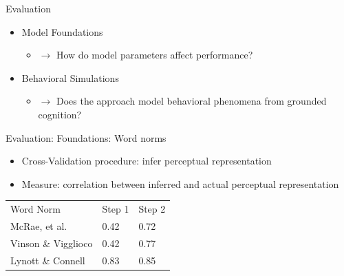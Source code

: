 \documentclass[12pt,a4paper]{beamer}
\begin{document}
\begin{frame}{Evaluation}
\begin{itemize}
    \item Model Foundations
        \begin{itemize}
        \item $\to$ How do model parameters affect performance?
        \end{itemize}
    \item Behavioral Simulations
        \begin{itemize}
        \item $\to$ Does the approach model behavioral phenomena from grounded cognition?
        \end{itemize}
\end{itemize}
\end{frame}

\begin{frame}{Evaluation: Foundations: Word norms}
\begin{itemize}
\item Cross-Validation procedure: infer perceptual representation
\item Measure: correlation between inferred and actual perceptual representation
\end{itemize}
\begin{table}
    \begin{tabular}{lll}
    Word Norm          & Step 1 & Step 2 \\
    McRae, et al.      & 0.42   & 0.72   \\
    Vinson \& Vigglioco & 0.42   & 0.77   \\
    Lynott \& Connell   & 0.83   & 0.85   \\
    \end{tabular}
\end{table}
\end{frame}
\end{document}
